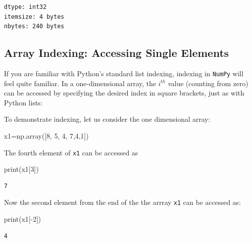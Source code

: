 \documentclass[
  letterpaper,
  DIV=11,
  numbers=noendperiod]{scrreprt}
\newenvironment{Shaded}{\begin{snugshade}}{\end{snugshade}}
\newcommand{\BuiltInTok}[1]{\textcolor[rgb]{0.00,0.23,0.31}{#1}}
\newcommand{\DecValTok}[1]{\textcolor[rgb]{0.68,0.00,0.00}{#1}}
\newcommand{\NormalTok}[1]{\textcolor[rgb]{0.00,0.23,0.31}{#1}}
\newcommand{\OperatorTok}[1]{\textcolor[rgb]{0.37,0.37,0.37}{#1}}
\theoremstyle{plain}
\theoremstyle{definition}
\theoremstyle{remark}
\begin{document}
\begin{verbatim}
dtype: int32
itemsize: 4 bytes
nbytes: 240 bytes
\end{verbatim}

\subsection{Array Indexing: Accessing Single
Elements}\label{array-indexing-accessing-single-elements}

If you are familiar with Python's standard list indexing, indexing in
\texttt{NumPy} will feel quite familiar. In a one-dimensional array, the
\(i^{th}\) value (counting from zero) can be accessed by specifying the
desired index in square brackets, just as with Python lists:

To demonstrate indexing, let us consider the one dimensional array:

\begin{Shaded}
\begin{Highlighting}[]
\NormalTok{x1}\OperatorTok{=}\NormalTok{np.array([}\DecValTok{8}\NormalTok{, }\DecValTok{5}\NormalTok{, }\DecValTok{4}\NormalTok{, }\DecValTok{7}\NormalTok{,}\DecValTok{4}\NormalTok{,}\DecValTok{1}\NormalTok{])}
\end{Highlighting}
\end{Shaded}

The fourth element of \texttt{x1} can be accessed as

\begin{Shaded}
\begin{Highlighting}[]
\BuiltInTok{print}\NormalTok{(x1[}\DecValTok{3}\NormalTok{])}
\end{Highlighting}
\end{Shaded}

\begin{verbatim}
7
\end{verbatim}

Now the second element from the end of the the arrray \texttt{x1} can be
accessed as:

\begin{Shaded}
\begin{Highlighting}[]
\BuiltInTok{print}\NormalTok{(x1[}\OperatorTok{{-}}\DecValTok{2}\NormalTok{])}
\end{Highlighting}
\end{Shaded}

\begin{verbatim}
4
\end{verbatim}
\end{document}
